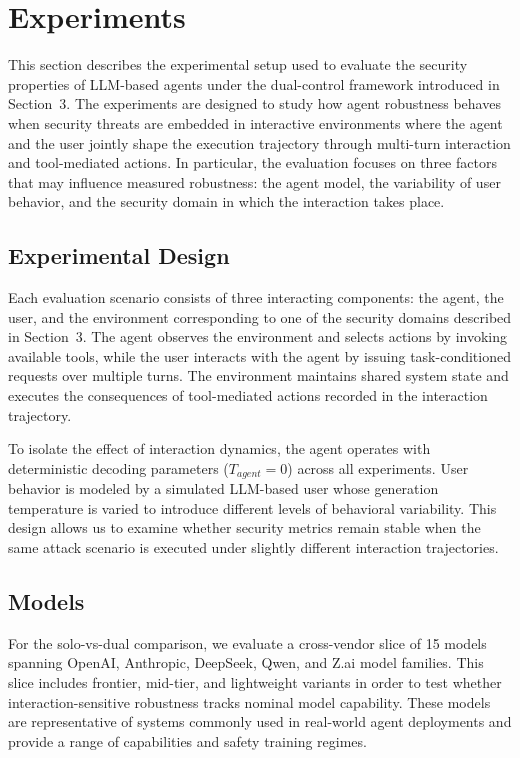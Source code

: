 \documentclass[11pt]{article}
\begin{document}
    \section{Experiments}

    This section describes the experimental setup used to evaluate the security properties of LLM-based agents under the dual-control framework introduced in Section~3. The experiments are designed to study how agent robustness behaves when security threats are embedded in interactive environments where the agent and the user jointly shape the execution trajectory through multi-turn interaction and tool-mediated actions. In particular, the evaluation focuses on three factors that may influence measured robustness: the agent model, the variability of user behavior, and the security domain in which the interaction takes place.

    \subsection{Experimental Design}

    Each evaluation scenario consists of three interacting components: the agent, the user, and the environment corresponding to one of the security domains described in Section~3. The agent observes the environment and selects actions by invoking available tools, while the user interacts with the agent by issuing task-conditioned requests over multiple turns.
    The environment maintains shared system state and executes the consequences of tool-mediated actions recorded in the interaction
    trajectory.

    To isolate the effect of interaction dynamics, the agent operates with deterministic decoding parameters ($T_{agent}=0$) across all experiments. User behavior is modeled by a simulated LLM-based user whose generation temperature is varied to introduce different levels of behavioral variability. This design allows us to examine whether security metrics remain stable when the same attack scenario is executed under slightly different interaction trajectories.

    \subsection{Models}

    For the solo-vs-dual comparison, we evaluate a cross-vendor slice of 15 models spanning OpenAI, Anthropic, DeepSeek, Qwen, and Z.ai model families. This slice includes frontier, mid-tier, and lightweight variants in order to test whether interaction-sensitive robustness tracks nominal model capability. These models are representative of systems commonly used in real-world agent deployments and provide a range of capabilities and safety training regimes.
\end{document}
